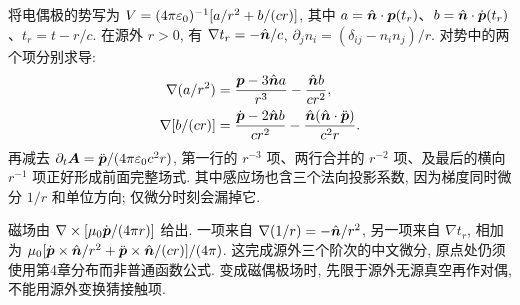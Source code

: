 将电偶极的势写为 $V=(4\pi\varepsilon_0)^{-1}[a/r^2+b/(cr)]$, 其中 $a=\hat{\boldsymbol{n}}\cdot\boldsymbol{p}(t_r)$、$b=\hat{\boldsymbol{n}}\cdot\dot{\boldsymbol{p}}(t_r)$、$t_r=t-r/c$. 在源外 $r>0$, 有 $\nabla t_r=-\hat{\boldsymbol{n}}/c$, $\partial_jn_i=(\delta_{ij}-n_in_j)/r$. 对势中的两个项分别求导:
\begin{align*}
 \nabla(a/r^2)&=\frac{\boldsymbol{p}-3\hat{\boldsymbol{n}} a}{r^3}-\frac{\hat{\boldsymbol{n}} b}{cr^2},\\
 \nabla[b/(cr)]&=\frac{\dot{\boldsymbol{p}}-2\hat{\boldsymbol{n}} b}{cr^2}
 -\frac{\hat{\boldsymbol{n}}(\hat{\boldsymbol{n}}\cdot\ddot{\boldsymbol{p}})}{c^2r}.
\end{align*}
再减去 $\partial_t\boldsymbol{A}=\ddot{\boldsymbol{p}}/(4\pi\varepsilon_0 c^2r)$, 第一行的 $r^{-3}$ 项、两行合并的 $r^{-2}$ 项、及最后的横向 $r^{-1}$ 项正好形成前面完整场式. 其中感应场也含三个法向投影系数, 因为梯度同时微分 $1/r$ 和单位方向; 仅微分时刻会漏掉它.

磁场由 $\nabla\times[\mu_0\dot{\boldsymbol{p}}/(4\pi r)]$ 给出. 一项来自 $\nabla(1/r)=-\hat{\boldsymbol{n}}/r^2$, 另一项来自 $\nabla t_r$, 相加为
$\mu_0[\dot{\boldsymbol{p}}\times\hat{\boldsymbol{n}}/r^2+\ddot{\boldsymbol{p}}\times\hat{\boldsymbol{n}}/(cr)]/(4\pi)$.
这完成源外三个阶次的中文微分, 原点处仍须使用第4章分布而非普通函数公式. 变成磁偶极场时, 先限于源外无源真空再作对偶, 不能用源外变换猜接触项.
